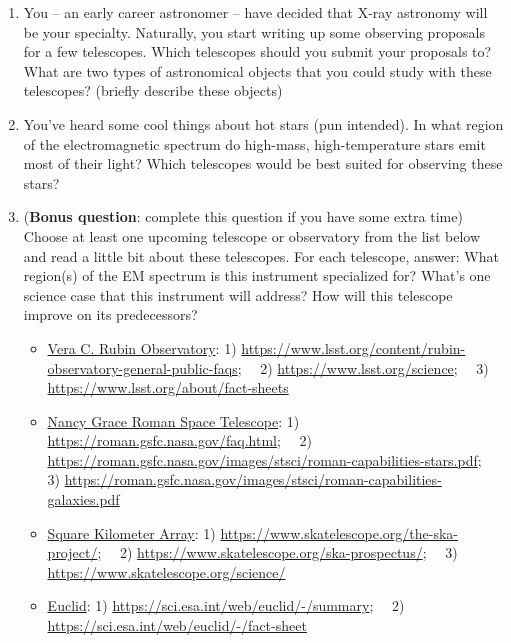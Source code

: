 \documentclass[11pt]{article}
\begin{document}
\begin{enumerate}
    \item You -- an early career astronomer -- have decided that X-ray astronomy will be your specialty. Naturally, you start writing up some observing proposals for a few telescopes. Which telescopes should you submit your proposals to? What are two types of astronomical objects that you could study with these telescopes? (briefly describe these objects)     
    \item You've heard some cool things about hot stars (pun intended). In what region of the electromagnetic spectrum do high-mass, high-temperature stars emit most of their light? Which telescopes would be best suited for observing these stars?  
    
    \item (\textbf{Bonus question}: complete this question if you have some extra time)  Choose at least one upcoming telescope or observatory from the list below and read a little bit about these telescopes. For each telescope, answer: What region(s) of the EM spectrum is this instrument specialized for? What's one science case that this instrument will address? How will this telescope improve on its predecessors?
    \begin{itemize}
        \item \underline{Vera C. Rubin Observatory}: 1) \url{https://www.lsst.org/content/rubin-observatory-general-public-faqs}; \, \, 2) \url{https://www.lsst.org/science}; \, \, 3) \url{https://www.lsst.org/about/fact-sheets}
        
        \item \underline{Nancy Grace Roman Space Telescope}: 1) \url{https://roman.gsfc.nasa.gov/faq.html}; \, \, 2) \url{https://roman.gsfc.nasa.gov/images/stsci/roman-capabilities-stars.pdf}; \, \, 3) \url{https://roman.gsfc.nasa.gov/images/stsci/roman-capabilities-galaxies.pdf}
        
        \item \underline{Square Kilometer Array}: 1) \url{https://www.skatelescope.org/the-ska-project/}; \, \, 2) \url{https://www.skatelescope.org/ska-prospectus/}; \, \, 3) \url{https://www.skatelescope.org/science/}
        
        \item \underline{Euclid}: 1) \url{https://sci.esa.int/web/euclid/-/summary}; \, \, 2) \url{https://sci.esa.int/web/euclid/-/fact-sheet}
    \end{itemize}
    
\end{enumerate}
\end{document}
